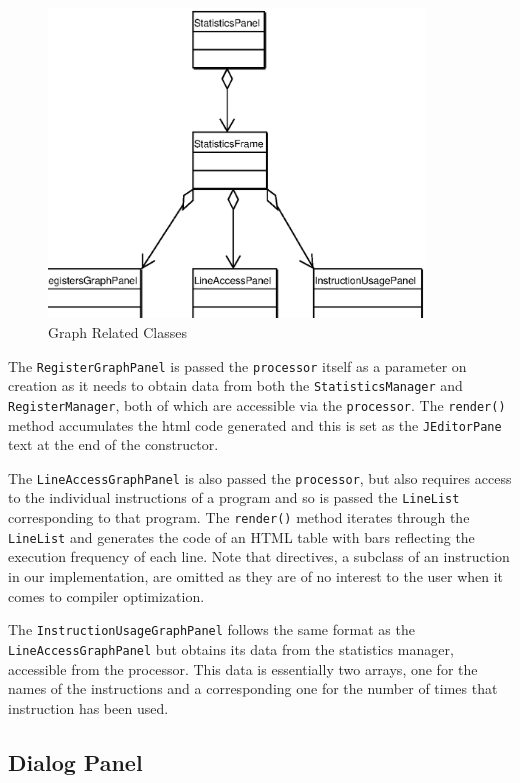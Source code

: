 \begin{figure}[htbp]
\begin{center}
\includegraphics[width=10cm]{GraphsClasses.eps}
\end{center}
\caption{Graph Related Classes}
\label{figLineList}
\end{figure}

The {\tt RegisterGraphPanel} is passed the {\tt processor} itself as a parameter on creation as it needs to obtain data from both the {\tt StatisticsManager} and {\tt RegisterManager}, both of which are accessible via the {\tt processor}. The {\tt render()} method accumulates the html code generated and this is set as the {\tt JEditorPane} text at the end of the constructor.

The {\tt LineAccessGraphPanel} is also passed the {\tt processor}, but also requires access to the individual instructions of a program and so is passed the {\tt LineList} corresponding to that program. The {\tt render()} method iterates through the {\tt LineList} and generates the code of an HTML table with bars reflecting the execution frequency of each line. Note that directives, a subclass of an instruction in our implementation, are omitted as they are of no interest to the user when it comes to compiler optimization.

The {\tt InstructionUsageGraphPanel} follows the same format as the {\tt LineAccessGraphPanel} but obtains its data from the statistics manager, accessible from the processor. This data is essentially two arrays, one for the names of the instructions and a corresponding one for the number of times that instruction has been used.


\subsection{Dialog Panel}

